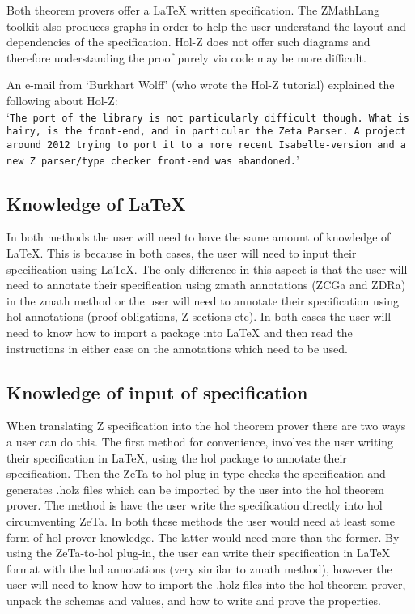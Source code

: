 Both theorem provers offer a \LaTeX{} written specification.
The ZMathLang toolkit also produces graphs in order to help the user understand
the layout and dependencies of the specification. Hol-Z does not offer such diagrams and
therefore understanding the proof purely via code may be more difficult.

An e-mail from `Burkhart Wolff' (who wrote the Hol-Z tutorial) explained the following
about Hol-Z:
\\
`\texttt{The port of the library is not particularly difficult though.
What is hairy, is the front-end, and in particular the Zeta Parser.
A project around 2012 trying to port it to a more recent Isabelle-version
and a \\ new Z parser/type checker front-end was abandoned.}'

\subsection{Knowledge of \LaTeX}

In both methods the user will need to have the same amount of knowledge of
\LaTeX{}. This is because in both cases, the user will need to input their
specification using \LaTeX{}. The only difference in this aspect is that the
user will need to annotate their specification using \gls{zmath} annotations
(ZCGa and ZDRa) in the \gls{zmath} method or the user will need to annotate
their specification using \gls{hol} annotations (proof obligations, Z sections
etc). In both cases the user will need to know how to import a package into
\LaTeX{} and then read the instructions in either case on the annotations which
need to be used.

\subsection{Knowledge of input of specification}
\label{knowledgeofinputforbb}

When translating Z specification into the \gls{hol} theorem prover there are two
ways a user can do this. The first method for convenience, involves the user
writing their specification in \LaTeX{}, using the \gls{hol} package to annotate
their specification. Then the ZeTa-to-\gls{hol} plug-in type checks the
specification and generates .holz files which can be imported by the user into
the \gls{hol} theorem prover. The method is have the user write the
specification directly into \gls{hol} circumventing ZeTa. In both these methods
the user would need at least some form of \gls{hol} prover knowledge. The latter
would need more than the former. By using the ZeTa-to-\gls{hol} plug-in, the
user can write their specification in \LaTeX{} format with the \gls{hol}
annotations (very similar to \gls{zmath} method), however the user will need to
know how to import the .holz files into the \gls{hol} theorem prover, unpack the
schemas and values, and how to write and prove the properties.

